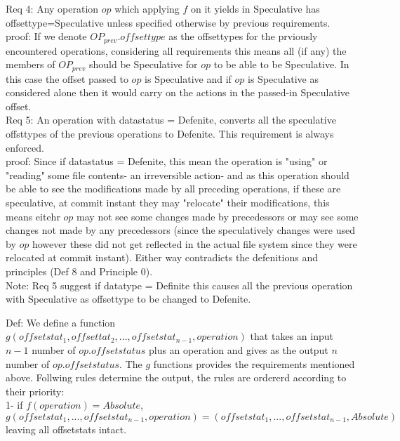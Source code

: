 \documentclass[a4paper, 11pt]{article}
\begin{document}
Req 4: Any operation $op$ which applying $f$ on it yields in Speculative has offsettype=Speculative unless specified otherwise by previous requirements.\\

proof: If we denote $OP_{prev}.offsettype$ as the offsettypes for the prviously encountered operations, considering all requirements this means all (if any) the members of $OP_{prev}$ should be Speculative for $op$ to be able to be Speculative. In this case the offset passed to $op$ is Speculative and if $op$ is Speculative as considered alone then it would carry on the actions in the passed-in Speculative offset.\\ 

Req 5: An operation with datastatus = Defenite, converts all the speculative offsttypes of the previous operations to Defenite. This requirement is always enforced.\\

proof: Since if datastatus = Defenite, this mean the operation is "using" or "reading" some file contents- an irreversible action- and as this operation should be able to see the modifications made by all preceding operations, if these are speculative, at commit instant they may "relocate" their modifications, this means eitehr $op$ may not see some changes made by precedessors or may see some changes not made by any precedessors (since the speculatively changes were used by $op$ however these did not get reflected in the actual file system since they were relocated at commit instant). Either way contradicts the defenitions and principles (Def 8 and Principle 0).\\

Note: Req 5 suggest if datatype = Definite this causes all the previous operation with Speculative as offsettype to be changed to Defenite.

Def: We define a function $g(offsetstat_1, offsettat_2, ..., offsetstat_{n-1}, operation)$ that takes an input  $n-1$ number of $op.offsetstatus$ plus an operation and gives as the output $n$ number of $op.offsetstatus$. The $g$ functions provides the requirements mentioned above. Follwing rules determine the output, the rules are ordererd according to their priority:\\

1- if $f(operation) = Absolute$, $g(offsetstat_1, ..., {offsetstat_{n-1}}, operation) = ({offsetstat_1}, ..., {offsetstat_{n-1}}, Absolute)$ leaving all offsetstats intact.\\
\end{document}
